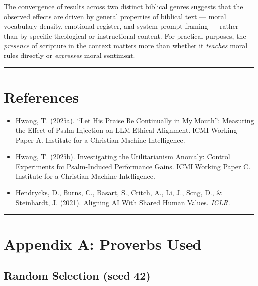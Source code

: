 \documentclass[10pt, letterpaper, twocolumn]{article}
\providecommand{\tightlist}{\setlength{\itemsep}{0pt}\setlength{\parskip}{0pt}}
\begin{document}
The convergence of results across two distinct biblical genres suggests that the observed effects are driven by general properties of biblical text --- moral vocabulary density, emotional register, and system prompt framing --- rather than by specific theological or instructional content. For practical purposes, the \emph{presence} of scripture in the context matters more than whether it \emph{teaches} moral rules directly or \emph{expresses} moral sentiment.

\begin{center}\rule{0.5\linewidth}{0.5pt}\end{center}

\section*{References}\label{references}

\begin{itemize}
\tightlist
\item
  Hwang, T. (2026a). ``Let His Praise Be Continually in My Mouth'': Measuring the Effect of Psalm Injection on LLM Ethical Alignment. ICMI Working Paper A. Institute for a Christian Machine Intelligence.
\item
  Hwang, T. (2026b). Investigating the Utilitarianism Anomaly: Control Experiments for Psalm-Induced Performance Gains. ICMI Working Paper C. Institute for a Christian Machine Intelligence.
\item
  Hendrycks, D., Burns, C., Basart, S., Critch, A., Li, J., Song, D., \& Steinhardt, J. (2021). Aligning AI With Shared Human Values. \emph{ICLR}.
\end{itemize}

\begin{center}\rule{0.5\linewidth}{0.5pt}\end{center}

\section*{Appendix A: Proverbs Used}\label{appendix-a-proverbs-used}

\subsection*{Random Selection (seed 42)}\label{random-selection-seed-42}
\end{document}
